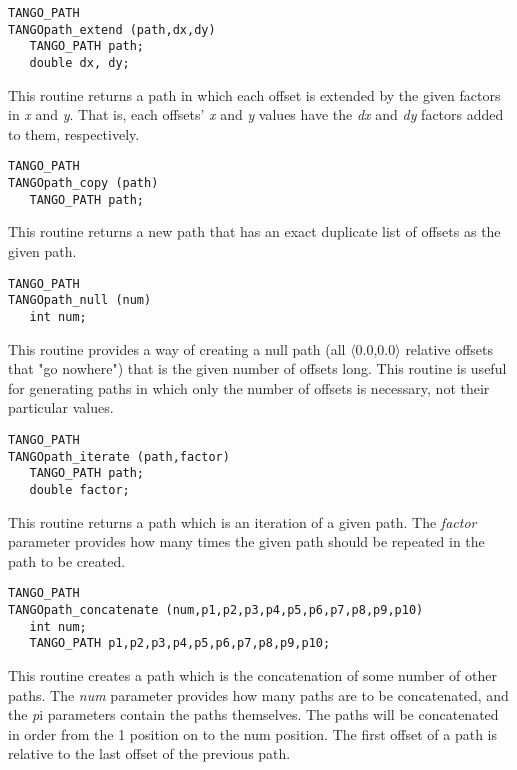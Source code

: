 \vspace{1em}
\begin{verbatim}
TANGO_PATH
TANGOpath_extend (path,dx,dy) 
   TANGO_PATH path;
   double dx, dy;
\end{verbatim}
This routine returns a path in which each offset is extended by the given
factors in {\em x} and {\em y}.  That is, each offsets' {\em x}
and {\em y}
values have the {\em dx} and {\em dy} factors added to them, respectively.

\vspace{1em}
\begin{verbatim}
TANGO_PATH
TANGOpath_copy (path) 
   TANGO_PATH path;
\end{verbatim}
This routine returns a new path that has an exact duplicate list of offsets as
the given path.

\vspace{1em}
\begin{verbatim}
TANGO_PATH
TANGOpath_null (num) 
   int num;
\end{verbatim}
This routine provides a way of creating a null path (all $\langle$0.0,0.0$\rangle$ relative
offsets that "go nowhere") that is the given number of offsets long.
This routine is useful for generating paths in which only the number of
offsets is necessary, not their particular values.

\vspace{1em}
\begin{verbatim}
TANGO_PATH
TANGOpath_iterate (path,factor) 
   TANGO_PATH path;
   double factor;
\end{verbatim}
This routine returns a path which is an iteration of a given path.
The {\em factor} parameter provides how many times the given path should be
repeated in the path to be created.

\vspace{1em}
\begin{verbatim}
TANGO_PATH
TANGOpath_concatenate (num,p1,p2,p3,p4,p5,p6,p7,p8,p9,p10) 
   int num;
   TANGO_PATH p1,p2,p3,p4,p5,p6,p7,p8,p9,p10;
\end{verbatim}
This routine creates a path which is the concatenation of some number of
other paths.  The {\em num} parameter provides how many paths are to be
concatenated, and the {\em p}i parameters contain the paths themselves.  The
paths will be concatenated in order from the 1 position on to the num
position. The first offset of a path is relative to the last offset of the
previous path.

